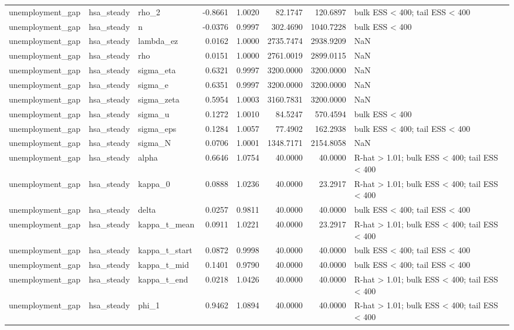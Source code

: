 \begin{tabular}{lllrrrrl}
unemployment\_gap & hsa\_steady & rho\_2 & -0.8661 & 1.0020 & 82.1747 & 120.6897 & bulk ESS < 400; tail ESS < 400 \\
unemployment\_gap & hsa\_steady & n & -0.0376 & 0.9997 & 302.4690 & 1040.7228 & bulk ESS < 400 \\
unemployment\_gap & hsa\_steady & lambda\_ez & 0.0162 & 1.0000 & 2735.7474 & 2938.9209 & NaN \\
unemployment\_gap & hsa\_steady & rho & 0.0151 & 1.0000 & 2761.0019 & 2899.0115 & NaN \\
unemployment\_gap & hsa\_steady & sigma\_eta & 0.6321 & 0.9997 & 3200.0000 & 3200.0000 & NaN \\
unemployment\_gap & hsa\_steady & sigma\_e & 0.6351 & 0.9997 & 3200.0000 & 3200.0000 & NaN \\
unemployment\_gap & hsa\_steady & sigma\_zeta & 0.5954 & 1.0003 & 3160.7831 & 3200.0000 & NaN \\
unemployment\_gap & hsa\_steady & sigma\_u & 0.1272 & 1.0010 & 84.5247 & 570.4594 & bulk ESS < 400 \\
unemployment\_gap & hsa\_steady & sigma\_eps & 0.1284 & 1.0057 & 77.4902 & 162.2938 & bulk ESS < 400; tail ESS < 400 \\
unemployment\_gap & hsa\_steady & sigma\_N & 0.0706 & 1.0001 & 1348.7171 & 2154.8058 & NaN \\
unemployment\_gap & hsa\_steady & alpha & 0.6646 & 1.0754 & 40.0000 & 40.0000 & R-hat > 1.01; bulk ESS < 400; tail ESS < 400 \\
unemployment\_gap & hsa\_steady & kappa\_0 & 0.0888 & 1.0236 & 40.0000 & 23.2917 & R-hat > 1.01; bulk ESS < 400; tail ESS < 400 \\
unemployment\_gap & hsa\_steady & delta & 0.0257 & 0.9811 & 40.0000 & 40.0000 & bulk ESS < 400; tail ESS < 400 \\
unemployment\_gap & hsa\_steady & kappa\_t\_mean & 0.0911 & 1.0221 & 40.0000 & 23.2917 & R-hat > 1.01; bulk ESS < 400; tail ESS < 400 \\
unemployment\_gap & hsa\_steady & kappa\_t\_start & 0.0872 & 0.9998 & 40.0000 & 40.0000 & bulk ESS < 400; tail ESS < 400 \\
unemployment\_gap & hsa\_steady & kappa\_t\_mid & 0.1401 & 0.9790 & 40.0000 & 40.0000 & bulk ESS < 400; tail ESS < 400 \\
unemployment\_gap & hsa\_steady & kappa\_t\_end & 0.0218 & 1.0426 & 40.0000 & 40.0000 & R-hat > 1.01; bulk ESS < 400; tail ESS < 400 \\
unemployment\_gap & hsa\_steady & phi\_1 & 0.9462 & 1.0894 & 40.0000 & 40.0000 & R-hat > 1.01; bulk ESS < 400; tail ESS < 400 \\

\end{tabular}
